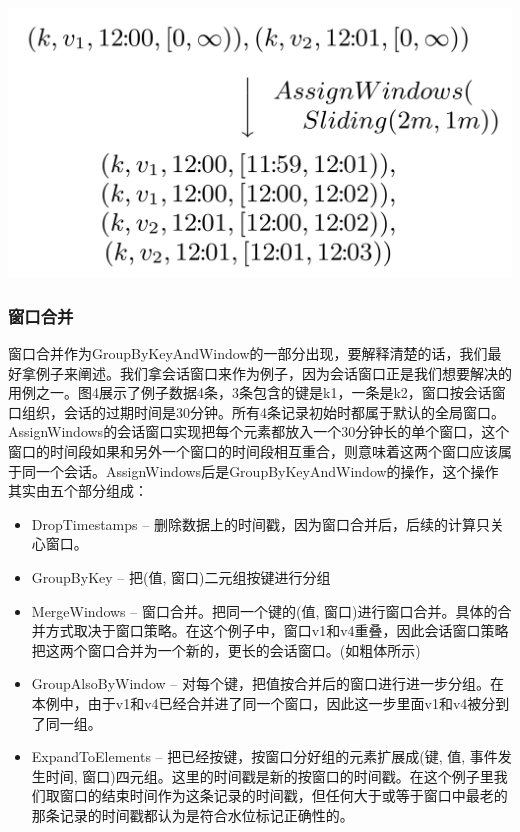 \documentclass[oneside]{ctexbook}
\begin{document}
\noindent \includegraphics[width=\textwidth]{windowassignment.png}

\subsubsection{窗口合并}

窗口合并作为GroupByKeyAndWindow的一部分出现，要解释清楚的话，我们最好拿例子来阐述。我们拿会话窗口来作为例子，因为会话窗口正是我们想要解决的用例之一。图4展示了例子数据4条，3条包含的键是k1，一条是k2，窗口按会话窗口组织，会话的过期时间是30分钟。所有4条记录初始时都属于默认的全局窗口。AssignWindows的会话窗口实现把每个元素都放入一个30分钟长的单个窗口，这个窗口的时间段如果和另外一个窗口的时间段相互重合，则意味着这两个窗口应该属于同一个会话。AssignWindows后是GroupByKeyAndWindow的操作，这个操作其实由五个部分组成：

\begin{itemize}
\item DropTimestamps – 删除数据上的时间戳，因为窗口合并后，后续的计算只关心窗口。
\item GroupByKey – 把(值, 窗口)二元组按键进行分组
\item MergeWindows – 窗口合并。把同一个键的(值, 窗口)进行窗口合并。具体的合并方式取决于窗口策略。在这个例子中，窗口v1和v4重叠，因此会话窗口策略把这两个窗口合并为一个新的，更长的会话窗口。(如粗体所示)
\item GroupAlsoByWindow – 对每个键，把值按合并后的窗口进行进一步分组。在本例中，由于v1和v4已经合并进了同一个窗口，因此这一步里面v1和v4被分到了同一组。
\item ExpandToElements – 把已经按键，按窗口分好组的元素扩展成(键, 值, 事件发生时间, 窗口)四元组。这里的时间戳是新的按窗口的时间戳。在这个例子里我们取窗口的结束时间作为这条记录的时间戳，但任何大于或等于窗口中最老的那条记录的时间戳都认为是符合水位标记正确性的。
\end{itemize}
\end{document}
